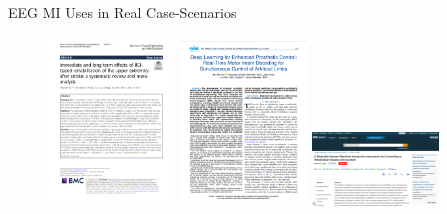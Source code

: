 \begin{frame}{EEG MI Uses in Real Case-Scenarios}
\begin{figure}
    \includegraphics[width=0.3\textwidth]{figures/literature/realcase/StrokeRehabilitation_paper}
    \includegraphics[width=0.3\textwidth]{figures/literature/realcase/ProsthesisControl_paper}
    \includegraphics[width=0.3\textwidth]{figures/literature/realcase/WheelchairControl_paper}
\end{figure}
\end{frame}
